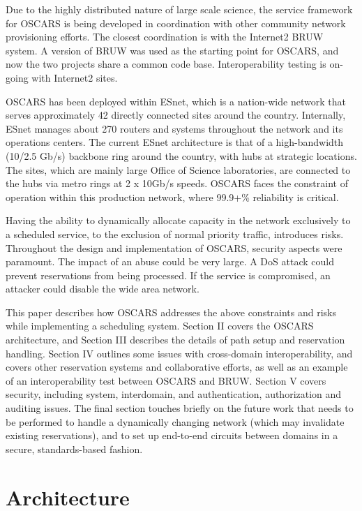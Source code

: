 \documentclass[conference]{IEEEtran}
\begin{document}
Due to the highly distributed nature of large scale science,
the service framework for OSCARS is being
developed in coordination with other community network provisioning efforts. 
The closest coordination is with the Internet2 BRUW \cite{BRUW}
system. 
A version of BRUW was used as the starting point for OSCARS, and now the two 
projects share a common code base. Interoperability testing is on-going with 
Internet2 sites. 

OSCARS has been deployed within ESnet,
which is a nation-wide network that serves approximately 42 directly connected 
sites around the country.  Internally, ESnet manages about 270 routers and 
systems throughout the network and its operations centers.  The current ESnet 
architecture is that of a high-bandwidth (10/2.5 Gb/s) backbone ring 
around the country, with hubs at strategic locations.  The sites, which are 
mainly
large Office of Science laboratories, are connected to the hubs via metro rings at 2 x 10Gb/s speeds.
OSCARS faces the constraint of operation within this production 
network, where 99.9+\% reliability is critical.

Having the ability to dynamically allocate capacity in the network exclusively 
to a scheduled service, to the exclusion of normal priority traffic, introduces 
risks.
Throughout the design and implementation of OSCARS, security aspects were
paramount.  The impact of an abuse could be very
large.  A DoS attack could prevent reservations from being processed.  If the
service is compromised, an attacker could disable the wide area network.

This paper describes how OSCARS addresses the above constraints and
risks while implementing a scheduling system.  Section II covers the 
OSCARS architecture, and Section III describes the details of
path setup and reservation handling. Section IV outlines some issues with cross-domain
interoperability, and covers other reservation systems and 
collaborative efforts, as well as 
an example of an interoperability test between OSCARS and BRUW.
Section V covers security, including system, interdomain, and authentication,
authorization and auditing issues.
The final section touches briefly on the future work that needs to be performed
to handle a dynamically changing network (which may invalidate existing
reservations), and to set up end-to-end circuits between domains
in a secure, standards-based fashion.

\section{Architecture}
\end{document}
